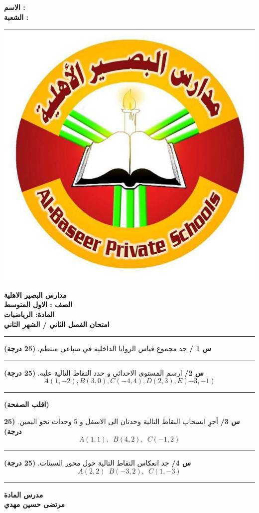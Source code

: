 \documentclass[14pt, a4paper]{extarticle}
\begin{document}
	\begin{minipage}{0.2\textwidth}
		\raggedleft
\textbf{الاسم : }\\[15pt]
\textbf{الشعبة : }
	\end{minipage}
	\hfill
		\begin{minipage}{0.25\textwidth}
		\raggedright\includegraphics[scale=0.11]{school.jpg}   
	\end{minipage}
	\hfill
	\begin{minipage}{0.35\textwidth}
		\raggedright
		\textbf{مدارس البصير الاهلية}\\
		\textbf{الصف : الاول المتوسط}\\
				\textbf{المادة: الرياضيات}\\
		\textbf{امتحان الفصل الثاني / الشهر الثاني}
	\end{minipage}
	\hrule
	\vspace{20pt}
	\textbf{س 1 /} جد مجموع قياس الزوايا الداخلية في سباعي منتظم. \hfill \textbf{(25 درجة)} 
	\vfill
	\hrule
	\vspace{20pt}
	\textbf{س 2/} ارسم المستوي الاحداثي و حدد النقاط التالية عليه. \hfill \textbf{(25 درجة)}
	\[
	A(1,-2), B(3,0), C(-4,4), D(2,3), E(-3,-1)
	\]
	\vfill
	\hrule
	\vspace{1pt}
	\begin{center}
\textbf{		(اقلب الصفحة)}
	\end{center}
	\newpage
	\textbf{س 3/} أجرٍ انسحاب النقاط التالية وحدتان الى الاسفل و 5 وحدات نحو اليمين. \hfill \textbf{(25 درجة)}
	\[
	A(1,1) ,\,\,\, B(4,2),\,\,\, C(-1, 2)
	\]
	\vfill
	\hrule
	\vspace{20pt}
	\textbf{س 4/} جد انعكاس النقاط التالية حول محور السينات. \hfill \textbf{(25 درجة)}
	\[
	A(2,2)\,\,\, B(-3,2),\,\,\, C(1,-3)
	\]
	\vfill
	\hrule
	\vspace{1pt}

	\begin{center}
		\textbf{مدرس المادة}\\
		\textbf{مرتضى حسين مهدي}
	\end{center}
\end{document}

